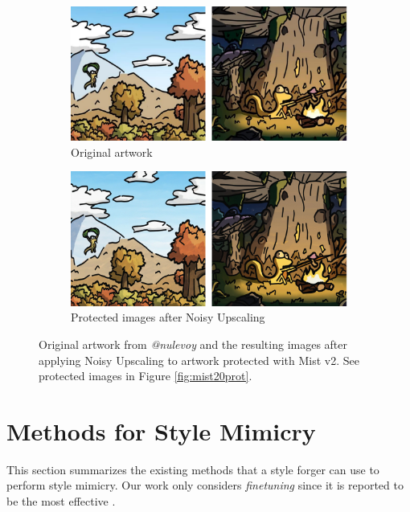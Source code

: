 \documentclass{article}
\begin{document}
\begin{figure}[h]
    \centering
        \begin{subfigure}[b]{0.49\textwidth}
         \centering
         \includegraphics[width=\textwidth]{plots/nulevoy-original.pdf}
         \caption{Original artwork}
     \end{subfigure}
     \hfill
     \begin{subfigure}[b]{0.49\textwidth}
         \centering
         \includegraphics[width=\textwidth]{plots/mist20upscale.pdf}
         \caption{Protected images after Noisy Upscaling}
     \end{subfigure}
    \caption{Original artwork from \emph{@nulevoy} and the resulting images after applying Noisy Upscaling to artwork protected with Mist v2. See protected images in Figure \ref{fig:mist20prot}.}
    \label{fig:mist20preproc}
\end{figure}

\newpage
\section{Methods for Style Mimicry}
\label{sec:stylemimicryappendix}

This section summarizes the existing methods that a style forger can use to perform style mimicry. Our work only considers \emph{finetuning} since it is reported to be the most effective \citep{glaze}.
\end{document}
